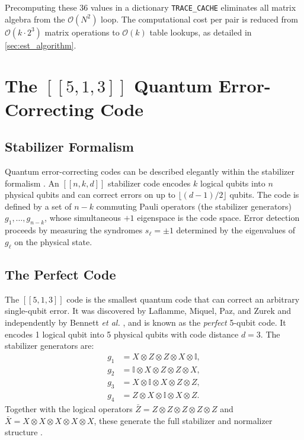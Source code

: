 \documentclass[12pt,a4paper,oneside]{book}
\theoremstyle{plain}
\theoremstyle{definition}
\theoremstyle{remark}
\begin{document}
Precomputing these 36 values in a dictionary \texttt{TRACE\_CACHE} eliminates all matrix algebra from the $\mathcal{O}(N^2)$ loop. The computational cost per pair is reduced from $\mathcal{O}(k \cdot 2^3)$ matrix operations to $\mathcal{O}(k)$ table lookups, as detailed in \cref{sec:est_algorithm}.

\section{The $[[5,1,3]]$ Quantum Error-Correcting Code}
\label{sec:code}

\subsection{Stabilizer Formalism}

Quantum error-correcting codes can be described elegantly within the stabilizer formalism \cite{gottesman1997stabilizer, nielsen2010quantum}. An $[[n,k,d]]$ stabilizer code encodes $k$ logical qubits into $n$ physical qubits and can correct errors on up to $\lfloor (d-1)/2 \rfloor$ qubits. The code is defined by a set of $n-k$ commuting Pauli operators (the stabilizer generators) $g_1, \dots, g_{n-k}$, whose simultaneous $+1$ eigenspace is the code space. Error detection proceeds by measuring the syndromes $s_\ell = \pm 1$ determined by the eigenvalues of $g_\ell$ on the physical state.

\subsection{The Perfect Code}

The $[[5,1,3]]$ code is the smallest quantum code that can correct an arbitrary single-qubit error. It was discovered by Laflamme, Miquel, Paz, and Zurek \cite{laflamme1996perfect} and independently by Bennett \textit{et al.} \cite{bennett1996mixed}, and is known as the \emph{perfect} 5-qubit code. It encodes 1 logical qubit into 5 physical qubits with code distance $d = 3$. The stabilizer generators are:
\begin{align}
    g_1 &= X \otimes Z \otimes Z \otimes X \otimes \mathbb{I}, \nonumber\\
    g_2 &= \mathbb{I} \otimes X \otimes Z \otimes Z \otimes X, \nonumber\\
    g_3 &= X \otimes \mathbb{I} \otimes X \otimes Z \otimes Z, \nonumber\\
    g_4 &= Z \otimes X \otimes \mathbb{I} \otimes X \otimes Z. \label{eq:stabilizers}
\end{align}
Together with the logical operators $\bar{Z} = Z \otimes Z \otimes Z \otimes Z \otimes Z$ and $\bar{X} = X \otimes X \otimes X \otimes X \otimes X$, these generate the full stabilizer and normalizer structure \cite{gottesman1997stabilizer}.
\end{document}
